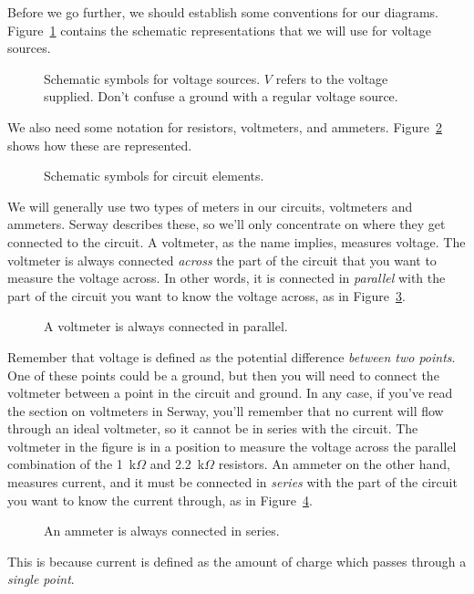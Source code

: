 Before we go further, we should establish some conventions for our diagrams. 
Figure~\ref{fig:DC:voltsource} contains the schematic representations that we 
will use for voltage sources.  
\suppressfloats
\begin{figure}[t]
\centerline{\epsfxsize=8cm }
\caption{Schematic symbols for voltage sources. $V$ refers to the voltage 
supplied. \hspace*{2cm}Don't confuse a ground with a regular voltage source.}
\label{fig:DC:voltsource}
\end{figure}
We also need some notation for resistors, voltmeters, and ammeters. 
Figure~\ref{fig:DC:schemdef} shows how these are represented.    
\begin{figure}[htb]
\centerline{\epsfxsize=13cm }
\caption{Schematic symbols for circuit elements.}
\label{fig:DC:schemdef}
\end{figure}

We will generally use two types of meters in our circuits, voltmeters and 
ammeters. Serway describes these, so we'll only concentrate on where they get 
connected to the circuit.  A voltmeter, as the name implies, measures voltage. 
The voltmeter is always connected {\it across} the part of the circuit that 
you want to measure the voltage across. In other words, it is connected in 
{\it parallel} with the part of the circuit you want to know the voltage 
across, as in Figure~\ref{fig:DC:voltmeter}.  
\begin{figure}[htb]
\centerline{\epsfxsize=10cm }
\caption{A voltmeter is always connected in parallel.}
\label{fig:DC:voltmeter}
\end{figure}
Remember that voltage is defined as the potential difference {\it between 
two points}.  One of these points could be a ground, but then you will need to 
connect the voltmeter between a point in the circuit and ground.  In any case,
if you've read the section on voltmeters in Serway, you'll remember that no 
current will flow through an ideal voltmeter, so it cannot be in series with 
the circuit. The voltmeter in the figure is in a position to measure the 
voltage across the parallel combination of the 1~k$\Omega$ and 2.2~k$\Omega$ 
resistors. An ammeter on the other hand, measures current, and it must be 
connected in {\it series} with the part of the circuit you want to know the 
current through, as in Figure~\ref{fig:DC:ammeter}. 
\begin{figure}[htb]
\centerline{\epsfxsize=10cm }
\caption{An ammeter is always connected in series.}
\label{fig:DC:ammeter}
\end{figure}
This is because current is defined as the amount of charge which passes through
a {\it single point}.
\clearpage

